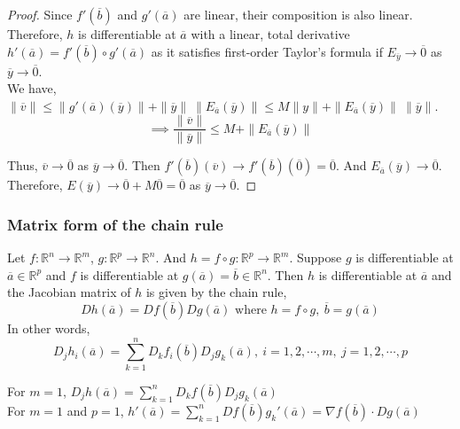 \begin{proof}
	Since $f'(\overline{b})$ and $g'(\overline{a})$ are linear, their composition is also linear.
	Therefore, $h$ is differentiable at $\overline{a}$ with a linear, total derivative $h'(\overline{a}) = f'(\overline{b}) \circ g'(\overline{a})$ as it satisfies first-order Taylor's formula if $E_{\overline{y}} \to \overline{0}$ as $\overline{y} \to \overline{0}$. \\

	We have, $\|\overline{v}\| \le \|g'(\overline{a})(\overline{y})\| + \|\overline{y}\|\ \|E_{\overline{a}}(\overline{y})\| \le M\|y\| + \|E_{\overline{a}}(\overline{y})\|\ \|\overline{y}\|$.
	\[ \implies \frac{\|\overline{v}\|}{\|\overline{y}\|} \le M + \|E_{\overline{a}}(\overline{y})\| \]

	Thus, $\overline{v} \to \overline{0}$ as $\overline{y} \to \overline{0}$.
	Then $f'(\overline{b})(\overline{v}) \to f'(\overline{b})(\overline{0}) = \overline{0}$.
	And $E_{\overline{a}}(\overline{y}) \to \overline{0}$.
	Therefore, $E(\overline{y}) \to \overline{0} + M\overline{0} = \overline{0}$ as $\overline{y} \to \overline{0}$.
\end{proof}
\subsubsection{Matrix form of the chain rule}
	Let $f : \mathbb{R}^n \to \mathbb{R}^m$, $g : \mathbb{R}^p \to \mathbb{R}^n$.
	And $h = f \circ g : \mathbb{R}^p \to \mathbb{R}^m$.
	Suppose $g$ is differentiable at $\overline{a} \in \mathbb{R}^p$ and $f$ is differentiable at $g(\overline{a}) = \overline{b} \in \mathbb{R}^n$.
	Then $h$ is differentiable at $\overline{a}$ and the Jacobian matrix of $h$ is given by the chain rule,
\[ Dh(\overline{a}) = Df(\overline{b})Dg(\overline{a}) \text{ where } h = f \circ g,\ \overline{b} = g(\overline{a})\]
In other words,
\[ D_jh_i(\overline{a}) = \sum_{k=1}^n D_k f_i(\overline{b}) D_j g_k(\overline{a}),\ i=1,2,\cdots,m,\ j=1,2,\cdots,p \]

	For $m=1$, $D_j h(\overline{a}) = \sum_{k=1}^n D_kf(\overline{b}) D_jg_k(\overline{a})$\\
	
	For $m=1$ and $p=1$, $h'(\overline{a}) = \sum_{k=1}^n Df(\overline{b}) g_k'(\overline{a}) = \nabla f(\overline{b}) \cdot Dg(\overline{a})$


